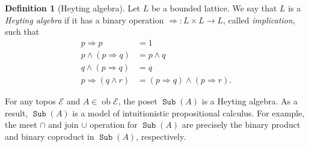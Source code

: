 \documentclass[10pt,letterpaper,cm]{nupset}
\theoremstyle{definition}
\newtheorem{definition}{Definition}%
\newtheorem{note}[definition]{Note}
\theoremstyle{theorem}
\theoremstyle{remark}
\newcommand{\1}{\mathbf{1}}
\renewcommand{\c}{\mathscr{C}}
\newcommand{\e}{\mathscr{E}}
\newcommand{\y}{\mathcal{Y}}
\newcommand{\0}{\vec 0}
\DeclareMathOperator{\sieves}{\mathtt{sieves}}
\DeclareMathOperator{\ob}{ob}
\DeclareMathOperator{\sub}{\mathtt{Sub}}
\begin{document}
\begin{comment}  
\begin{note} 
Let $\c$ be a small category and let $\y : \c \to \widehat{\c}$ denote the Yoneda embedding.
Let $U \in \ob{\c}$. For any sieve $\sigma$, define the subfunctor $F_{\sigma} \hookrightarrow \y_{U}$ by 
\[
A  \mapsto  \y_U(A) \cap \sigma
\] for  all $A \in \ob{\c}$. Conversely, for every subfunctor $F$ of $\y_U$, define the sieve 
\[
\sigma_F \equiv \coprod_{X \in \ob{\c}}F(X)
\] on $U$. Then $F_{-} : \sieves(U) \to \sub(\y_U)$ is a bijection with inverse $\sigma_{-}$.
\end{note}
\end{comment}

\medskip

\begin{definition}[Heyting algebra]
Let $L$ be a bounded lattice. We say that $L$ is a \textit{Heyting algebra} if it has a binary operation $\Rightarrow : L \times L \to L$, called \textit{implication}, such that 
\begin{align*}
p \Rightarrow p &  = 1
\\ p \land \left(p \Rightarrow q\right) & = p \land q
\\ q \land \left(p \Rightarrow q\right) & = q
\\ p \Rightarrow \left(q \land r\right) & = \left(p \Rightarrow q\right) \land \left(p \Rightarrow r\right).
\end{align*}
\end{definition}

\smallskip

For any topos $\e$ and $A \in \ob{\e}$, the poset $\sub(A)$ is a Heyting algebra. As a result, $\sub(A)$ is a model of intuitionistic  propositional calculus.  For example, the meet $\cap$ and join $\cup$ operation for $\sub(A)$ are precisely the binary product and binary coproduct in $\sub(A)$, respectively.  
\end{document}
